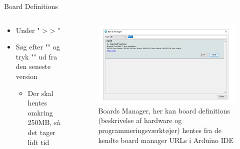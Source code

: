 \documentclass[aspectratio=169]{beamer}
\begin{document}
\begin{frame}{Board Definitions}
\begin{columns}
	\begin{column}{0.5\textwidth}
		\begin{textBox}
			\begin{itemize}
				\item Under " >  > "
				\item Søg efter "" og tryk "" ud fra den seneste version
				\begin{itemize}
					 \item Der skal hentes omkring 250MB, så det tager lidt tid
				\end{itemize}
			\end{itemize}
		\end{textBox}
	\end{column}
	\begin{column}{0.5\textwidth}
		\begin{figure}
  			\includegraphics[width=\textwidth]{assets/pictures/boardsmanager2.png}
  			\caption{Boards Manager, her kan board definitions (beskrivelse af hardware og programmeringsværktøjer) hentes fra de kendte board manager URLs i Arduino IDE}
  			\label{fig:boardsmanager2}
		\end{figure}
	\end{column}
\end{columns}
\end{frame}
\end{document}
